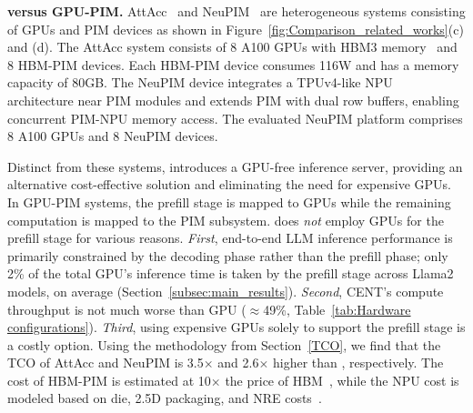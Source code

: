 


\textbf{\att{} versus GPU-PIM.} AttAcc~\cite{AttAcc} and NeuPIM~\cite{NeuPIM} are heterogeneous systems consisting of GPUs and PIM devices as shown in Figure~\ref{fig:Comparison_related_works}(c) and (d). The AttAcc system consists of 8 A100 GPUs with HBM3 memory~\cite{dgx-a100} and 8 HBM-PIM devices. Each HBM-PIM device consumes 116W and has a memory capacity of 80GB. The NeuPIM device integrates a TPUv4-like NPU~\cite{tpu} architecture near PIM modules and extends PIM with dual row buffers, enabling concurrent PIM-NPU memory access.  The evaluated NeuPIM platform comprises 8 A100 GPUs and 8 NeuPIM devices. 




Distinct from these systems, \att{} introduces a GPU-free inference server, providing an alternative cost-effective solution and eliminating the need for expensive GPUs. In GPU-PIM systems, the prefill stage is mapped to GPUs while the remaining computation is mapped to the PIM subsystem. \att{} does \emph{not} employ GPUs for the prefill stage for various reasons. \textit{First}, end-to-end LLM inference performance is primarily constrained by the decoding phase rather than the prefill phase; only 2\% of the total GPU's inference time is taken by the prefill stage across Llama2 models, on average (Section~\ref{subsec:main_results}). \textit{Second}, CENT’s compute throughput is not much worse than GPU ($\approx$49\%, Table~\ref{tab:Hardware configurations}). \textit{Third}, using expensive GPUs solely to support the prefill stage is a costly option. 
Using the methodology from Section~\ref{TCO}, we find that the TCO of AttAcc and NeuPIM is 3.5$\times$ and 2.6$\times$ higher than \att{}, respectively. The cost of HBM-PIM is estimated at 10$\times$ the price of HBM~\cite{HBM-price}, while the NPU cost is modeled based on die, 2.5D packaging, and NRE costs~\cite{tpu, palesko2014cost, moonwalk}.



